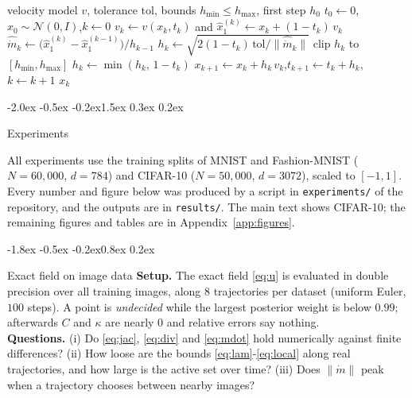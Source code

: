 \documentclass{article}
\makeatletter
\renewcommand{\normalsize}{\fontsize{10pt}{11pt}\selectfont}
\renewcommand{\section}{\@startsection{section}{1}{\z@}%
  {-2.0ex \@plus -0.5ex \@minus -0.2ex}{1.5ex \@plus 0.3ex \@minus 0.2ex}{\large\bfseries\raggedright}}
\renewcommand{\subsection}{\@startsection{subsection}{2}{\z@}%
  {-1.8ex \@plus -0.5ex \@minus -0.2ex}{0.8ex \@plus 0.2ex}{\normalsize\bfseries\raggedright}}
\theoremstyle{remark}
\newcommand{\tol}{\mathrm{tol}}
\makeatother
\begin{document}
\begin{algorithm}[t]
\caption{Curvature-adaptive Euler sampler}\label{alg:bendflow}
\begin{algorithmic}[1]
\Require velocity model $v$, tolerance $\tol$, bounds $h_{\min} \le h_{\max}$, first step $h_0$
\State $t_0 \gets 0$,\quad $x_0 \sim \mathcal N(0,I)$,\quad $k \gets 0$
  \State $v_k \gets v(x_k,t_k)$ and $\hat x_1^{(k)} \gets x_k + (1 - t_k)\,v_k$
    \State $\widehat{\dot m}_k \gets \big(\hat x_1^{(k)} - \hat x_1^{(k - 1)}\big)/h_{k - 1}$
    \State $h_k \gets \sqrt{2(1 - t_k)\,\tol/\|\widehat{\dot m}_k\|}$
    \State clip $h_k$ to $[h_{\min},h_{\max}]$
  \EndIf
  \State $h_k \gets \min(h_k,\,1 - t_k)$
  \State $x_{k + 1} \gets x_k + h_k\,v_k$,\quad $t_{k + 1} \gets t_k + h_k$,\quad $k \gets k + 1$
\EndWhile
\State \Return $x_k$
\end{algorithmic}
\end{algorithm}

\section{Experiments}\label{sec:experiments}

All experiments use the training splits of MNIST and Fashion-MNIST ($N = 60{,}000$, $d = 784$) and CIFAR-10 ($N = 50{,}000$, $d = 3072$), scaled to $[-1, 1]$. Every number and figure below was produced by a script in \texttt{experiments/} of the repository, and the outputs are in \texttt{results/}. The main text shows CIFAR-10; the remaining figures and tables are in Appendix~\ref{app:figures}.

\subsection{Exact field on image data}\label{sec:exp-exact}
\textbf{Setup.} The exact field \eqref{eq:u} is evaluated in double precision over all training images, along $8$ trajectories per dataset (uniform Euler, $100$ steps). A point is \emph{undecided} while the largest posterior weight is below $0.99$; afterwards $C$ and $\kappa$ are nearly $0$ and relative errors say nothing.\\
\textbf{Questions.} (i) Do \eqref{eq:jac}, \eqref{eq:div} and \eqref{eq:mdot} hold numerically against finite differences? (ii) How loose are the bounds \eqref{eq:lam}-\eqref{eq:local} along real trajectories, and how large is the active set over time? (iii) Does $\|\dot m\|$ peak when a trajectory chooses between nearby images?
\end{document}
